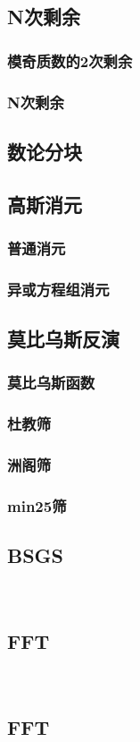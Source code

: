 \documentclass[twocolumn,a4]{article}
\newcommand{\addcpp}[1]{}
\begin{document}
	\subsection{N次剩余}
		\subsubsection{模奇质数的2次剩余}
			\addcpp{math/Quadratic_residue}
		\subsubsection{N次剩余}
	\subsection{数论分块}
	\subsection{高斯消元}
		\subsubsection{普通消元}
		\subsubsection{异或方程组消元}
	\subsection{莫比乌斯反演}
		\subsubsection{莫比乌斯函数}
		\subsubsection{杜教筛}
		\subsubsection{洲阁筛}
		\subsubsection{min25筛}
	\subsection{BSGS}
		\addcpp{math/EXBSGS}
​	 \subsection{FFT}
​		 \subsection{FFT}
			\addcpp{math/FFT}
\end{document}
